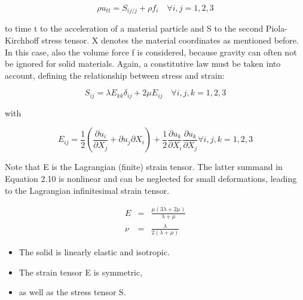 \begin{equation}
	\rho u_{tt} = S_{ij/j} + \rho f_i \quad \forall i,j = 1,2,3
\end{equation}

to time t to the acceleration of a material particle and S to the second Piola-Kirchhoff stress tensor. X
denotes the material coordinates as mentioned before. In this case, also the volume force f is considered,
because gravity can often not be ignored for solid materials. Again, a constitutive law must be taken into
account, defining the relationship between stress and strain:

\begin{equation}
	S_{ij} = \lambda E_{kk} \delta_{ij} + 2\mu E_{ij} \quad \forall i,j,k = 1,2,3
\end{equation}

with

\begin{equation}
	E_{ij} = \frac{1}{2}\left(\frac{\partial u_i}{\partial X_j}   + {\partial u_j}{\partial X_i} \right) + \frac{1}{2} \frac{\partial u_k}{\partial X_i}\frac{\partial u_k}{\partial X_j} \forall i,j,k = 1,2,3
\end{equation}

Note that E is the Lagrangian (finite) strain tensor. The latter summand in Equation 2.10 is nonlinear
and can be neglected for small deformations, leading to the Lagrangian infinitesimal strain tensor.

\begin{eqnarray}
	E &=& \frac{\mu(3\lambda+2\mu)}{\lambda + \mu} \\
	\nu &=& \frac{\lambda}{2(\lambda + \mu)}
\end{eqnarray}



\begin{itemize}
	\item The solid is linearly elastic and isotropic. 
	\item The strain tensor E is symmetric,
	\item as well as the stress tensor S. 
\end{itemize}


